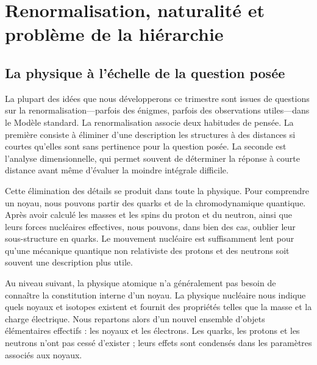 \chapter{Renormalisation, naturalité et problème de la hiérarchie}


\section{La physique à l’échelle de la question posée}

La plupart des idées que nous développerons ce trimestre sont issues de questions sur la renormalisation---parfois des énigmes, parfois des observations utiles---dans le Modèle standard. La renormalisation associe deux habitudes de pensée. La première consiste à éliminer d’une description les structures à des distances si courtes qu’elles sont sans pertinence pour la question posée. La seconde est l’analyse dimensionnelle, qui permet souvent de déterminer la réponse à courte distance avant même d’évaluer la moindre intégrale difficile.

Cette élimination des détails se produit dans toute la physique. Pour comprendre un noyau, nous pouvons partir des quarks et de la chromodynamique quantique. Après avoir calculé les masses et les spins du proton et du neutron, ainsi que leurs forces nucléaires effectives, nous pouvons, dans bien des cas, oublier leur sous-structure en quarks. Le mouvement nucléaire est suffisamment lent pour qu’une mécanique quantique non relativiste des protons et des neutrons soit souvent une description plus utile.

Au niveau suivant, la physique atomique n’a généralement pas besoin de connaître la constitution interne d’un noyau. La physique nucléaire nous indique quels noyaux et isotopes existent et fournit des propriétés telles que la masse et la charge électrique. Nous repartons alors d’un nouvel ensemble d’objets élémentaires effectifs : les noyaux et les électrons. Les quarks, les protons et les neutrons n’ont pas cessé d’exister ; leurs effets sont condensés dans les paramètres associés aux noyaux.

